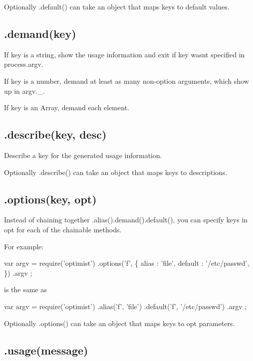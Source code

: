 Optionally {\ttfamily .default()} can take an object that maps keys to default values.

\subsection*{.demand(key) }

If {\ttfamily key} is a string, show the usage information and exit if {\ttfamily key} wasn\textquotesingle{}t specified in {\ttfamily process.\+argv}.

If {\ttfamily key} is a number, demand at least as many non-\/option arguments, which show up in {\ttfamily argv.\+\_\+}.

If {\ttfamily key} is an Array, demand each element.

\subsection*{.describe(key, desc) }

Describe a {\ttfamily key} for the generated usage information.

Optionally {\ttfamily .describe()} can take an object that maps keys to descriptions.

\subsection*{.options(key, opt) }

Instead of chaining together {\ttfamily .alias().demand().default()}, you can specify keys in {\ttfamily opt} for each of the chainable methods.

For example\+:


\begin{DoxyCode}
var argv = require('optimist')
    .options('f', \{
        alias : 'file',
        default : '/etc/passwd',
    \})
    .argv
;
\end{DoxyCode}


is the same as


\begin{DoxyCode}
var argv = require('optimist')
    .alias('f', 'file')
    .default('f', '/etc/passwd')
    .argv
;
\end{DoxyCode}


Optionally {\ttfamily .options()} can take an object that maps keys to {\ttfamily opt} parameters.

\subsection*{.usage(message) }

